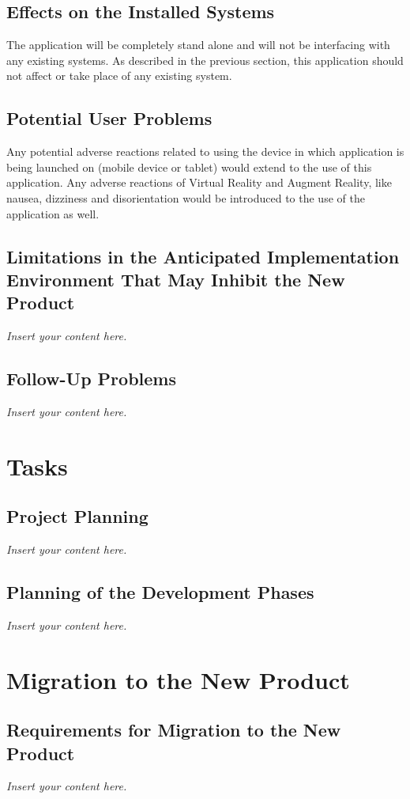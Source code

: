 \documentclass[12pt]{article}
\newcommand{\lips}{\textit{Insert your content here.}}
\begin{document}
\subsection{Effects on the Installed Systems}

The application will be completely stand alone and will not be interfacing with any existing systems.  As described in the previous section, this application should not affect or take place of any existing system.

\subsection{Potential User Problems}

Any potential adverse reactions related to using the device in which application is being launched on (mobile device or tablet) would extend to the use of this application.  Any adverse reactions of Virtual Reality and Augment Reality, like nausea, dizziness and disorientation would be introduced to the use of the application as well.

\subsection{Limitations in the Anticipated Implementation Environment That May
Inhibit the New Product}
\lips
\subsection{Follow-Up Problems}
\lips

\section{Tasks}
\subsection{Project Planning}
\lips
\subsection{Planning of the Development Phases}
\lips

\section{Migration to the New Product}
\subsection{Requirements for Migration to the New Product}
\lips
\end{document}
